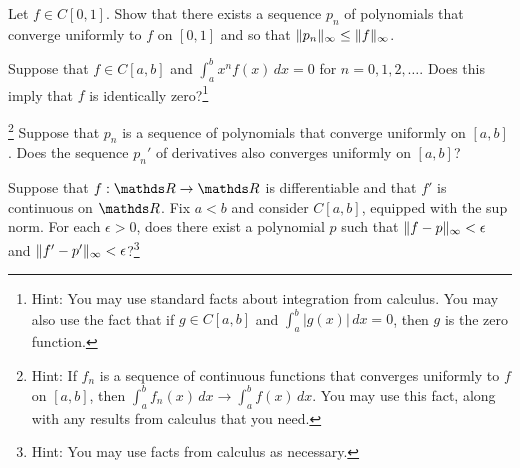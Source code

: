 \documentclass{../homework}
\date{Thursday 2/21}
\author{}
\begin{document}
\begin{Exercise}
	Let $f \in C[0,1]$.  Show that there exists a sequence $p_n$ of
  polynomials that converge uniformly to $f$ on $[0,1]$ and so that
  $\lVert {p_n} \rVert_{\infty} \leq \lVert {f} \rVert_{\infty}$.

  \begin{solution}

  \end{solution}
\end{Exercise}

\begin{Exercise}
	Suppose that $f \in C[a,b]$ and $\int_a^b x^n f(x)\,dx = 0$ for
  $n=0,1,2,\ldots$.  Does this imply that $f$ is identically
  zero?\footnote{Hint: You may use standard facts about integration
    from calculus.  You may also use the fact that if $g \in C[a,b]$
    and $\int_a^b |g(x)|\,dx = 0$, then $g$ is the zero function.}

  \begin{solution}

  \end{solution}
\end{Exercise}

\begin{Exercise}
	\footnote{Hint: If $f_n$ is a sequence of continuous functions that
    converges uniformly to $f$ on $[a,b]$, then
    $\int_a^b f_n(x)\,dx \to \int_a^b f(x)\,dx$.  You may use this
    fact, along with any results from calculus that you need.}
  Suppose that $p_n$ is a sequence of polynomials that converge
  uniformly on $[a,b]$.  Does the sequence $p_n'$ of derivatives also
  converges uniformly on $[a,b]$?

  \begin{solution}

  \end{solution}
\end{Exercise}

\begin{Exercise}
	Suppose that $f:\R\to\R$ is differentiable and that $f'$ is
  continuous on $\R$.  Fix $a<b$ and consider $C[a,b]$, equipped with
  the sup norm.  For each $\epsilon >0$, does there exist a polynomial
  $p$ such that $\lVert {f - p} \rVert_{\infty} < \epsilon$ and
  $\lVert {f' - p'} \rVert_{\infty} < \epsilon$?\footnote{Hint: You may use
    facts from calculus as necessary.}

  \begin{solution}

  \end{solution}
\end{Exercise}
\end{document}
